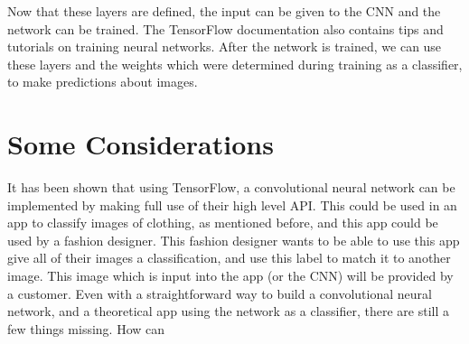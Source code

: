 \documentclass[12pt]{report} %
\begin{document}
	Now that these layers are defined, the input can be given to the CNN and the network can be trained. The TensorFlow documentation also contains tips and tutorials on training neural networks\cite{tensorFlow}. After the network is trained, we can use these layers and the weights which were determined during training as a classifier, to make predictions about images.
	
\chapter{Some Considerations}
	It has been shown that using TensorFlow, a convolutional neural network can be implemented by making full use of their high level API. This could be used in an app to classify images of clothing, as mentioned before, and this app could be used by a fashion designer. This fashion designer wants to be able to use this app give all of their images a classification, and use this label to match it to another image. This image which is input into the app (or the CNN) will be provided by a customer. Even with a straightforward way to build a convolutional neural network, and a theoretical app using the network as a classifier, there are still a few things missing.
	How can 
 


\end{document}
